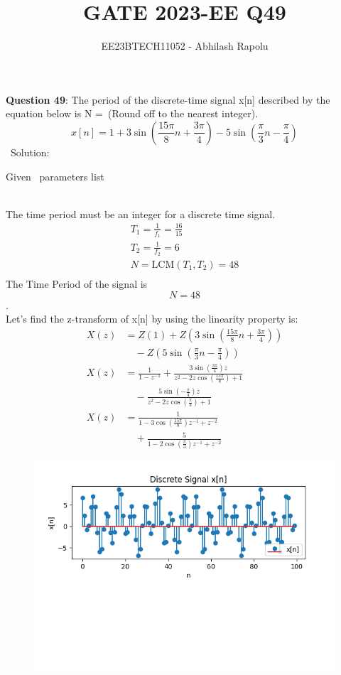 \documentclass[journal,12pt,twocolumn]{IEEEtran}
\title{GATE 2023-EE Q49}
\author{EE23BTECH11052 - Abhilash Rapolu 
}
\begin{document}
\maketitle
\newpage
\bigskip
\renewcommand{\thefigure}{\arabic{figure}}
\renewcommand{\thetable}{\arabic{table}}
\textbf{Question 49}: The period of the discrete-time signal x[n] described by the equation below is N =\ (Round off to the nearest integer).
$$x[n] = 1 + 3\sin\left(\frac{15\pi}{8}n + \frac{3\pi}{4}\right) - 5\sin\left(\frac{\pi}{3}n - \frac{\pi}{4}\right)$$
\ Solution:
\begin{table}[htbp] \small
\centering

\caption{Given \, parameters list}
\end{table}\\
The time period must be an integer for a discrete time signal.\\
\begin{align}
T_1 = \frac{1}{f_1} = \frac{16}{15} \\
T_2 = \frac{1}{f_2} = 6 \\
N = \text{LCM}(T_1, T_2) = 48\\
\end{align}
The Time Period of the signal is $$N =48$$.\\
Let's find the z-transform of x[n] by using the linearity property is:\\
\begin{align}
    X(z) &= Z(1) + Z\left(3\sin\left(\frac{15\pi}{8}n + \frac{3\pi}{4}\right)\right)\\ 
    &\quad- Z\left(5\sin\left(\frac{\pi}{3}n - \frac{\pi}{4}\right)\right)\\ 
    X(z) &= \frac{1}{1 - z^{-1}} + \frac{3\sin\left(\frac{3\pi}{4}\right)z}{z^2 - 2z\cos\left(\frac{15\pi}{8}\right) + 1} \\
    &\quad- \frac{5\sin\left(-\frac{\pi}{4}\right)z}{z^2 - 2z\cos\left(\frac{\pi}{3}\right) + 1}\\
    X(z) &= \frac{1}{1 - 3\cos\left(\frac{15\pi}{8}\right)z^{-1} + z^{-2}} \\
    &\quad+ \frac{5}{1 - 2\cos\left(\frac{\pi}{3}\right)z^{-1} + z^{-2}}
\end{align}

\begin{figure}[!ht] 
\centering
\includegraphics[width=\columnwidth]{graph.png}
\caption{}
\label{fig:Graph1}
\end{figure}
\end{document}
